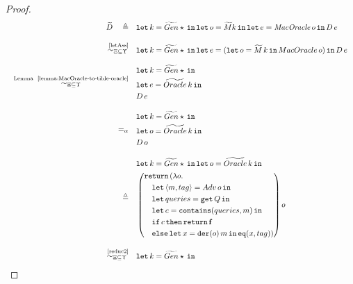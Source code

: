 \begin{proof}
\small{
\begin{align*}
    \widetilde{D}\quad\triangleq\quad& \letin{k=\widetilde{Gen} \star} \letin{o=\widetilde{M} k} \letin{e=\mathit{MacOracle}\,o}{D\,e}      
    \\[2ex]
    \quad \overset{\text{~\ref{letAss}}}{\simcontext}\quad&
    \begin{aligned}
        &\letin{k=\widetilde{Gen} \star}\letin{e=(\letin{o=\widetilde{M}\,k}{MacOracle}\,o)}{D\,e}
    \end{aligned}
    \\[2ex]
    \quad \overset{\text{Lemma ~\ref{lemma:MacOracle-to-tilde-oracle}}} {\simcontext} \quad&
    \begin{aligned}
        &\letin{k=\widetilde{Gen}\star} \\&\letin{e=\widetilde{Oracle}\,k}{} 
        \\&{D\,e}
    \end{aligned}
    \\[2ex]
    \quad=_{\alpha}\quad&
    \begin{aligned}
        &\letin{k=\widetilde{Gen}\star} \\
        &\letin{o=\widetilde{Oracle}\,k}{} \\
        &{D\,o}
    \end{aligned}
    \\[2ex]
    \quad\triangleq\quad&
    \begin{aligned}
        &\letin{k=\widetilde{Gen}\star}\letin{o=\widetilde{Oracle}\,k}{} \\
        &\left(
        \begin{aligned}
            &\return(\lambda o. \\
            &\quad \letin{\lis{m,tag} = Adv\, o}{} \\
            &\quad \letin{queries = \get Q}{} \\
            &\quad \letin{c=\mathtt{contains}(queries, m)}{} \\
            &\quad \mathtt{if}\, c\, \mathtt{then}\, \return \false \\
            &\quad \mathtt{else}\,\letin{x=\mathtt{der}(o)\, m}{\mathtt{eq}(x,tag))}
        \end{aligned}
        \right) o
    \end{aligned}
    \\[2ex]
    \quad\overset{\text{~\ref{reduc2}}}{\simcontext}\quad&
    \begin{aligned}
        &\letin{k=\widetilde{Gen}\star}{} \\

\end{aligned}
\end{align*}}
\end{proof}
